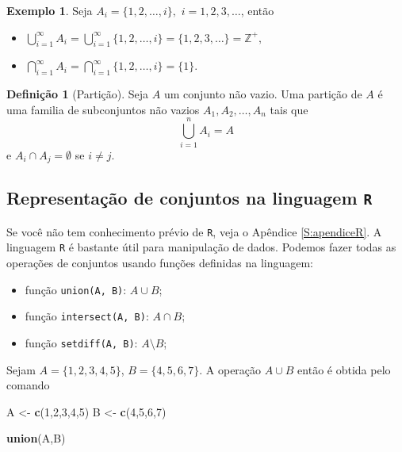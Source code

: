 \documentclass[]{book}
\newenvironment{Shaded}{\begin{snugshade}}{\end{snugshade}}
\newcommand{\DecValTok}[1]{\textcolor[rgb]{0.00,0.00,0.81}{#1}}
\newcommand{\KeywordTok}[1]{\textcolor[rgb]{0.13,0.29,0.53}{\textbf{#1}}}
\newcommand{\NormalTok}[1]{#1}
\newcommand{\StringTok}[1]{\textcolor[rgb]{0.31,0.60,0.02}{#1}}
\providecommand{\tightlist}{%
  \setlength{\itemsep}{0pt}\setlength{\parskip}{0pt}}
\theoremstyle{definition}
\newtheorem{definition}{Definição}[chapter]
\theoremstyle{definition}
\newtheorem{example}{Exemplo}[chapter]
\theoremstyle{definition}
\theoremstyle{remark}
\begin{document}
\begin{example}
\protect\hypertarget{exm:unnamed-chunk-17}{}{\label{exm:unnamed-chunk-17} }Seja \(A_i = \{1,2,\ldots, i\},\) \(i=1,2,3, \ldots\), então

\begin{itemize}
\item
  \(\bigcup_{i=1}^{\infty}A_i = \bigcup_{i=1}^{\infty}\{1,2,\ldots, i\}=\{1,2,3,\ldots\}=\mathbb{Z}^+,\)
\item
  \(\bigcap_{i=1}^{\infty}A_i = \bigcap_{i=1}^{\infty}\{1,2,\ldots, i\}=\{1\}.\)
\end{itemize}
\end{example}

\begin{definition}[Partição]
\protect\hypertarget{def:defPart}{}{\label{def:defPart} \iffalse (Partição) \fi{} }Seja \(A\) um conjunto não vazio.
Uma partição de \(A\) é uma familia de subconjuntos não vazios \(A_1, A_2, \ldots, A_n\) tais que
\[\bigcup_{i=1}^{n}A_i=A\]
e \(A_i \cap A_j = \emptyset\) se \(i \neq j.\)
\end{definition}

\hypertarget{representauxe7uxe3o-de-conjuntos-na-linguagem-r}{%
\subsection{\texorpdfstring{Representação de conjuntos na linguagem \texttt{R}}{Representação de conjuntos na linguagem R}}\label{representauxe7uxe3o-de-conjuntos-na-linguagem-r}}

Se você não tem conhecimento prévio de \texttt{R}, veja o Apêndice \ref{S:apendiceR}.
A linguagem \texttt{R} é bastante útil para manipulação de dados.
Podemos fazer todas as operações de conjuntos usando funções definidas na linguagem:

\begin{itemize}
\tightlist
\item
  função \texttt{union(A,\ B)}: \(A \cup B\);
\item
  função \texttt{intersect(A,\ B)}: \(A \cap B\);
\item
  função \texttt{setdiff(A,\ B)}: \(A \setminus B\);
\end{itemize}

Sejam \(A = \{1,2,3,4,5\}\), \(B=\{4,5,6,7\}\).
A operação \(A \cup B\) então é obtida pelo comando

\begin{Shaded}
\begin{Highlighting}[]
\NormalTok{A <-}\StringTok{ }\KeywordTok{c}\NormalTok{(}\DecValTok{1}\NormalTok{,}\DecValTok{2}\NormalTok{,}\DecValTok{3}\NormalTok{,}\DecValTok{4}\NormalTok{,}\DecValTok{5}\NormalTok{)}
\NormalTok{B <-}\StringTok{ }\KeywordTok{c}\NormalTok{(}\DecValTok{4}\NormalTok{,}\DecValTok{5}\NormalTok{,}\DecValTok{6}\NormalTok{,}\DecValTok{7}\NormalTok{)}

\KeywordTok{union}\NormalTok{(A,B)}
\end{Highlighting}
\end{Shaded}
\end{document}
